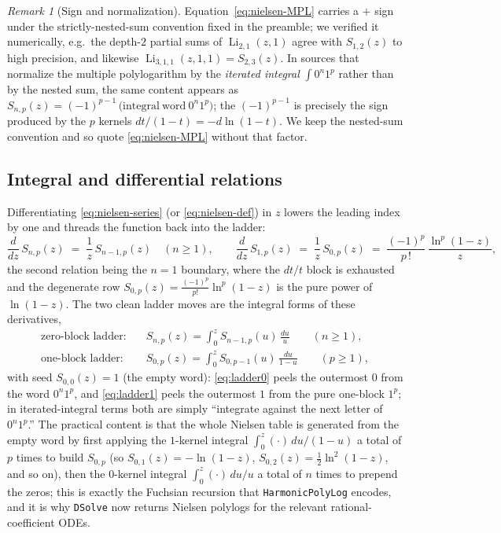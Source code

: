 \documentclass[11pt]{article}
\DeclareMathOperator{\Li}{Li}
\theoremstyle{plain}
\theoremstyle{remark}
\newtheorem{remark}[theorem]{Remark}
\begin{document}
\begin{remark}[Sign and normalization]
Equation~\eqref{eq:nielsen-MPL} carries a $+$ sign under the strictly-nested-sum convention fixed in the preamble; we verified it numerically, e.g.\ the depth-$2$ partial sums of $\Li_{2,1}(z,1)$ agree with $S_{1,2}(z)$ to high precision, and likewise $\Li_{3,1,1}(z,1,1)=S_{2,3}(z)$. In sources that normalize the multiple polylogarithm by the \emph{iterated integral} $\int 0^{n}1^{p}$ rather than by the nested sum, the same content appears as $S_{n,p}(z)=(-1)^{p-1}\,\mathrm{(integral~word~}0^{n}1^{p})$; the $(-1)^{p-1}$ is precisely the sign produced by the $p$ kernels $dt/(1-t)=-d\ln(1-t)$. We keep the nested-sum convention and so quote \eqref{eq:nielsen-MPL} without that factor.
\end{remark}

\subsection{Integral and differential relations}

Differentiating \eqref{eq:nielsen-series} (or \eqref{eq:nielsen-def}) in $z$ lowers the leading index by one and threads the function back into the ladder:
\begin{equation}\label{eq:dSnp}
  \frac{d}{dz}\,S_{n,p}(z)\;=\;\frac{1}{z}\,S_{n-1,p}(z)\quad(n\ge1),
  \qquad
  \frac{d}{dz}\,S_{1,p}(z)\;=\;\frac{1}{z}\,S_{0,p}(z)\;=\;\frac{(-1)^{p}}{p\,!}\,\frac{\ln^{p}(1-z)}{z},
\end{equation}
the second relation being the $n=1$ boundary, where the $dt/t$ block is exhausted and the degenerate row $S_{0,p}(z)=\tfrac{(-1)^{p}}{p!}\ln^{p}(1-z)$ is the pure power of $\ln(1-z)$. The two clean ladder moves are the integral forms of these derivatives,
\begin{align}
  \text{zero-block ladder:}\quad
    & S_{n,p}(z)=\int_0^{z}S_{n-1,p}(u)\,\frac{du}{u}\qquad (n\ge1),\label{eq:ladder0}\\[2pt]
  \text{one-block ladder:}\quad
    & S_{0,p}(z)=\int_0^{z} S_{0,p-1}(u)\,\frac{du}{1-u}\qquad (p\ge1),\label{eq:ladder1}
\end{align}
with seed $S_{0,0}(z)=1$ (the empty word): \eqref{eq:ladder0} peels the outermost $0$ from the word $0^{n}1^{p}$, and \eqref{eq:ladder1} peels the outermost $1$ from the pure one-block $1^{p}$; in iterated-integral terms both are simply ``integrate against the next letter of $0^{n}1^{p}$.'' The practical content is that the whole Nielsen table is generated from the empty word by first applying the $1$-kernel integral $\int_0^{z}(\cdot)\,du/(1-u)$ a total of $p$ times to build $S_{0,p}$ (so $S_{0,1}(z)=-\ln(1-z)$, $S_{0,2}(z)=\tfrac12\ln^{2}(1-z)$, and so on), then the $0$-kernel integral $\int_0^{z}(\cdot)\,du/u$ a total of $n$ times to prepend the zeros; this is exactly the Fuchsian recursion that \texttt{HarmonicPolyLog} encodes, and it is why \texttt{DSolve} now returns Nielsen polylogs for the relevant rational-coefficient ODEs.
\end{document}
